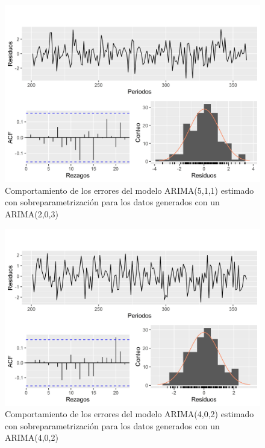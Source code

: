 \documentclass[
]{article}
\begin{document}
\begin{figure}[H]
\includegraphics[width=1\linewidth,height=1\textheight]{Tesis_files/figure-latex/errores_simulados_sobreparametrizacion3-1} \caption{Comportamiento de los errores del modelo ARIMA(5,1,1) estimado con sobreparametrización para los datos generados con un ARIMA(2,0,3)}\label{fig:errores_simulados_sobreparametrizacion3}
\end{figure}

\begin{figure}[H]
\includegraphics[width=1\linewidth,height=1\textheight]{Tesis_files/figure-latex/errores_simulados_sobreparametrizacion4-1} \caption{Comportamiento de los errores del modelo ARIMA(4,0,2) estimado con sobreparametrización para los datos generados con un ARIMA(4,0,2)}\label{fig:errores_simulados_sobreparametrizacion4}
\end{figure}
\end{document}
